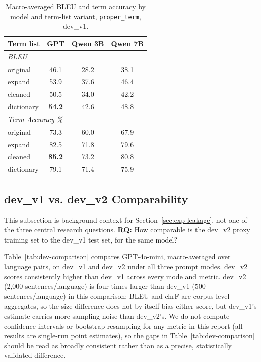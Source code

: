 \documentclass[11pt]{article}
\begin{document}
\begin{table}[t]
  \centering
  \small
  \begin{tabular}{lccc}
    \hline
    \textbf{Term list} & \textbf{GPT} & \textbf{Qwen 3B} & \textbf{Qwen 7B} \\
    \hline
    \multicolumn{4}{l}{\emph{BLEU}} \\
    original   & 46.1 & 28.2 & 38.1 \\
    expand     & 53.9 & 37.6 & 46.4 \\
    cleaned    & 50.5 & 34.0 & 42.2 \\
    dictionary & \textbf{54.2} & 42.6 & 48.8 \\
    \hline
    \multicolumn{4}{l}{\emph{Term Accuracy \%}} \\
    original   & 73.3 & 60.0 & 67.9 \\
    expand     & 82.5 & 71.8 & 79.6 \\
    cleaned    & \textbf{85.2} & 73.2 & 80.8 \\
    dictionary & 79.1 & 71.4 & 75.9 \\
    \hline
  \end{tabular}
  \caption{Macro-averaged BLEU and term accuracy by model and term-list variant, \texttt{proper\_term}, dev\_v1.}
  \label{tab:models-by-variant}
\end{table}

\subsection{dev\_v1 vs. dev\_v2 Comparability}
\label{sec:exp-dataset-comparison}

This subsection is background context for Section~\ref{sec:exp-leakage}, not one of the three central research questions. \textbf{RQ:} How comparable is the dev\_v2 proxy training set to the dev\_v1 test set, for the same model?

Table~\ref{tab:dev-comparison} compares GPT-4o-mini, macro-averaged over language pairs, on dev\_v1 and dev\_v2 under all three prompt modes. dev\_v2 scores consistently higher than dev\_v1 across every mode and metric. dev\_v2 (2{,}000 sentences/language) is four times larger than dev\_v1 (500 sentences/language) in this comparison; BLEU and chrF are corpus-level aggregates, so the size difference does not by itself bias either score, but dev\_v1's estimate carries more sampling noise than dev\_v2's. We do not compute confidence intervals or bootstrap resampling for any metric in this report (all results are single-run point estimates), so the gaps in Table~\ref{tab:dev-comparison} should be read as broadly consistent rather than as a precise, statistically validated difference.
\end{document}
